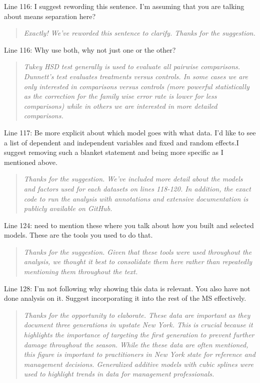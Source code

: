 \documentclass{article}
\begin{document}
Line 116:  I suggest rewording this sentence. I'm assuming that you are talking about means separation here?

\begin{quote}
    \textit{Exactly!  We've reworded this sentence to clarify.  Thanks for the suggestion.  }
\end{quote}

Line 116: Why use both, why not just one or the other? 

\begin{quote}
    \textit{Tukey HSD test generally is used to evaluate all pairwise comparisons.  Dunnett's test evaluates treatments versus controls.  In some cases we are only interested in comparisons versus controls (more powerful statistically as the correction for the family wise error rate is lower for less comparisons) while in others we are interested in more detailed comparisons.  }
\end{quote}

Line 117: Be more explicit about which model goes with what data. I'd like to see a list of dependent and independent variables and fixed and random effects.I suggest removing such a blanket statement and being more specific as I mentioned above.

\begin{quote}
    \textit{Thanks for the suggestion.  We've included more detail about the models and factors used for each datasets on lines 118-120.  In addition, the exact code to run the analysis with annotations and extensive documentation is publicly available on GitHub.  }
\end{quote}

Line 124: need to mention these where you talk about how you built and selected models. These are the tools you used to do that.

\begin{quote}
    \textit{Thanks for the suggestion.  Given that these tools were used throughout the analysis, we thought it best to consolidate them here rather than repeatedly mentioning them throughout the text.  }
\end{quote}

Line 128: I'm not following why showing this data is relevant. You also have not done analysis on it. Suggest incorporating it into the rest of the MS effectively.

\begin{quote}
    \textit{Thanks for the opportunity to elaborate.  These data are important as they document three generations in upstate New York.  This is crucial because it highlights the importance of targeting the first generation to prevent further damage throughout the season.  While the these data are often mentioned, this figure is important to practitioners in New York state for reference and management decisions.  Generalized additive models with cubic splines were used to highlight trends in data for management professionals.  }
\end{quote}
\end{document}
